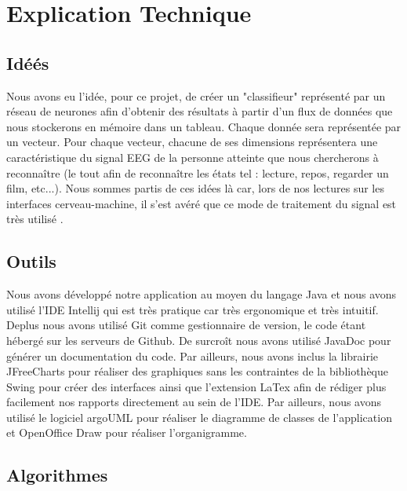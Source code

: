 
	\chapter{Explication Technique} %
	\label{chap:explication_technique}
		
		\section{Idéés} %
		\label{sec:idees}

		
		Nous avons eu l'idée, pour ce projet, de créer un "classifieur" représenté par un réseau de neurones afin d'obtenir des résultats à partir d'un flux de données que nous stockerons en mémoire dans un tableau. Chaque donnée sera représentée par un vecteur. Pour chaque vecteur, chacune de ses dimensions représentera une caractéristique du signal EEG de la personne atteinte que nous chercherons à reconnaître (le tout afin de reconnaître les états tel : lecture, repos, regarder un film, etc...). Nous sommes partis de ces idées là car, lors de nos lectures sur les interfaces cerveau-machine, il s'est avéré que ce mode de traitement du signal est très utilisé .
		
		\section{Outils} %
		\label{sec:outils}
		
		Nous avons développé notre application au moyen du langage Java et nous avons utilisé l'IDE Intellij qui est très pratique car très ergonomique et très intuitif. 
		Deplus nous avons utilisé Git comme gestionnaire de version, le code étant hébergé sur les serveurs de Github. De surcroît nous avons utilisé JavaDoc pour générer un documentation du code.
		Par ailleurs, nous avons inclus la librairie JFreeCharts pour réaliser des graphiques sans les contraintes de la bibliothèque Swing pour créer des interfaces ainsi que l'extension LaTex afin de rédiger plus facilement nos rapports directement au sein de l'IDE.
		Par ailleurs, nous avons utilisé le logiciel argoUML pour réaliser le diagramme de classes de l'application et OpenOffice Draw pour réaliser l'organigramme.
		
		\section{Algorithmes} %
		\label{sec:algorithmes}
		
